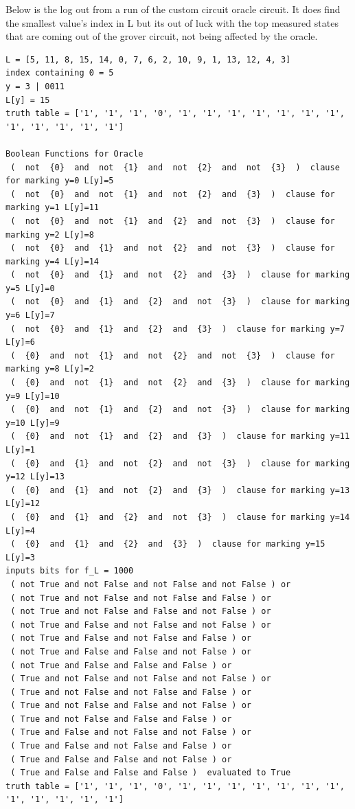\documentclass[11pt]{article}
\begin{document}
\newpage 
Below is the log out from a run of the custom circuit oracle circuit. It does find the smallest value's index in L but its out of luck with the top measured states that are coming out of the grover circuit, not being affected by the oracle.
\begin{verbatim}
L = [5, 11, 8, 15, 14, 0, 7, 6, 2, 10, 9, 1, 13, 12, 4, 3]
index containing 0 = 5
y = 3 | 0011
L[y] = 15
truth table = ['1', '1', '1', '0', '1', '1', '1', '1', '1', '1', '1', '1', '1', '1', '1', '1']

Boolean Functions for Oracle
 (  not  {0}  and  not  {1}  and  not  {2}  and  not  {3}  )  clause for marking y=0 L[y]=5
 (  not  {0}  and  not  {1}  and  not  {2}  and  {3}  )  clause for marking y=1 L[y]=11
 (  not  {0}  and  not  {1}  and  {2}  and  not  {3}  )  clause for marking y=2 L[y]=8
 (  not  {0}  and  {1}  and  not  {2}  and  not  {3}  )  clause for marking y=4 L[y]=14
 (  not  {0}  and  {1}  and  not  {2}  and  {3}  )  clause for marking y=5 L[y]=0
 (  not  {0}  and  {1}  and  {2}  and  not  {3}  )  clause for marking y=6 L[y]=7
 (  not  {0}  and  {1}  and  {2}  and  {3}  )  clause for marking y=7 L[y]=6
 (  {0}  and  not  {1}  and  not  {2}  and  not  {3}  )  clause for marking y=8 L[y]=2
 (  {0}  and  not  {1}  and  not  {2}  and  {3}  )  clause for marking y=9 L[y]=10
 (  {0}  and  not  {1}  and  {2}  and  not  {3}  )  clause for marking y=10 L[y]=9
 (  {0}  and  not  {1}  and  {2}  and  {3}  )  clause for marking y=11 L[y]=1
 (  {0}  and  {1}  and  not  {2}  and  not  {3}  )  clause for marking y=12 L[y]=13
 (  {0}  and  {1}  and  not  {2}  and  {3}  )  clause for marking y=13 L[y]=12
 (  {0}  and  {1}  and  {2}  and  not  {3}  )  clause for marking y=14 L[y]=4
 (  {0}  and  {1}  and  {2}  and  {3}  )  clause for marking y=15 L[y]=3
inputs bits for f_L = 1000
 ( not True and not False and not False and not False ) or 
 ( not True and not False and not False and False ) or 
 ( not True and not False and False and not False ) or 
 ( not True and False and not False and not False ) or 
 ( not True and False and not False and False ) or 
 ( not True and False and False and not False ) or 
 ( not True and False and False and False ) or 
 ( True and not False and not False and not False ) or 
 ( True and not False and not False and False ) or 
 ( True and not False and False and not False ) or 
 ( True and not False and False and False ) or 
 ( True and False and not False and not False ) or 
 ( True and False and not False and False ) or 
 ( True and False and False and not False ) or 
 ( True and False and False and False )  evaluated to True
truth table = ['1', '1', '1', '0', '1', '1', '1', '1', '1', '1', '1', '1', '1', '1', '1', '1']


\end{verbatim}
\end{document}
